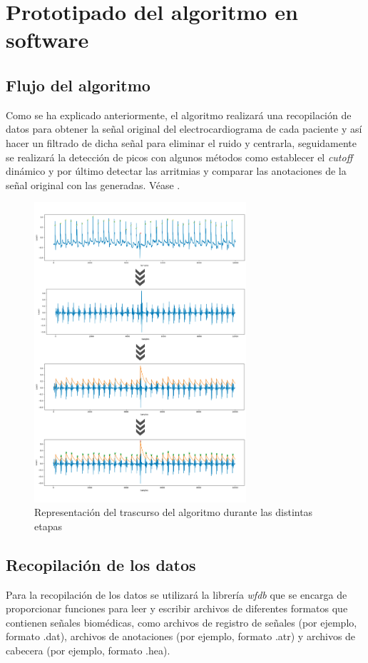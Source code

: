 \chapter{Prototipado del algoritmo en software}

\section{Flujo del algoritmo}
Como se ha explicado anteriormente, el algoritmo realizará una recopilación de datos para obtener la señal original del electrocardiograma de cada paciente y así hacer un filtrado de dicha señal para eliminar el ruido y centrarla, seguidamente se realizará la detección de picos con algunos métodos como establecer el \textit{cutoff} dinámico y por último detectar las arritmias y comparar las anotaciones de la señal original con las generadas. Véase .

\begin{figure}[h!]
    \centering
    \includegraphics[width=0.7\textwidth]{./Images/img_algoritmo/esquemaGeneral.jpg}
    \caption[Representación del trascurso del prototipo]{Representación del trascurso del algoritmo durante las distintas etapas}
    \label{fig:esquemaGeneral}
\end{figure}

\section{Recopilación de los datos}
Para la recopilación de los datos se utilizará la librería \textit{wfdb} \cite{WFDB} que se encarga de proporcionar funciones para leer y escribir archivos de diferentes formatos que contienen señales biomédicas, como archivos de registro de señales (por ejemplo, formato .dat), archivos de anotaciones (por ejemplo, formato .atr) y archivos de cabecera (por ejemplo, formato .hea). 

